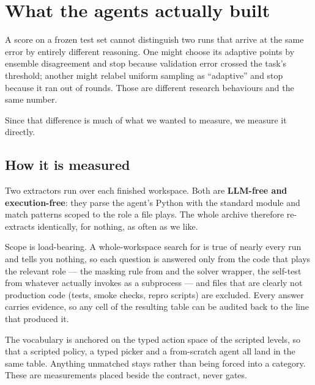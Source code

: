 \section{What the agents actually built}
\label{sec:agentlogic}

A score on a frozen test set cannot distinguish two runs that arrive at the same
error by entirely different reasoning. One might choose its adaptive points by
ensemble disagreement and stop because validation error crossed the task's
threshold; another might relabel uniform sampling as ``adaptive'' and stop
because it ran out of rounds. Those are different research behaviours and the
same number.

Since that difference is much of what we wanted to measure, we measure it
directly.

\subsection{How it is measured}

Two extractors run over each finished workspace. Both are \textbf{LLM-free and
execution-free}: they parse the agent's Python with the standard 
module and match patterns scoped to the role a file plays. The whole archive
therefore re-extracts identically, for nothing, as often as we like.

Scope is load-bearing. A whole-workspace search for  is true of
nearly every run and tells you nothing, so each question is answered only from
the code that plays the relevant role --- the masking rule from
 and the solver wrapper, the self-test from whatever actually
invokes  as a subprocess --- and files that are clearly not
production code (tests, smoke checks, repro scripts) are excluded. Every answer
carries  evidence, so any cell of the resulting table can be
audited back to the line that produced it.

The vocabulary is anchored on the typed action space of the scripted levels, so
that a scripted policy, a typed picker and a from-scratch agent all land in the
same table. Anything unmatched stays  rather than being forced
into a category. These are measurements placed beside the contract, never
gates.

